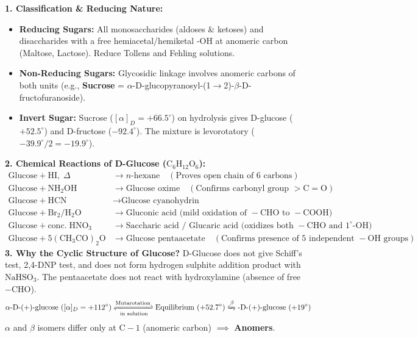 \documentclass[10pt,a4paper]{article}
\begin{document}
\begin{formulabox}
\textbf{1. Classification \& Reducing Nature:}
\begin{itemize}
  \item \textbf{Reducing Sugars:} All monosaccharides (aldoses \& ketoses) and disaccharides with a free hemiacetal/hemiketal -OH at anomeric carbon (Maltose, Lactose). Reduce Tollens and Fehling solutions.
  \item \textbf{Non-Reducing Sugars:} Glycosidic linkage involves anomeric carbons of both units (e.g., \textbf{Sucrose} = $\alpha$-D-glucopyranosyl-(1$\to$2)-$\beta$-D-fructofuranoside).
  \item \textbf{Invert Sugar:} Sucrose ($[\alpha]_D = +66.5^\circ$) on hydrolysis gives D-glucose ($+52.5^\circ$) and D-fructose ($-92.4^\circ$). The mixture is levorotatory ($-39.9^\circ / 2 = -19.9^\circ$).
\end{itemize}
\textbf{2. Chemical Reactions of D-Glucose ($\mathrm{C_6H_{12}O_6}$):}
\begin{align*}
  \mathrm{Glucose} + \mathrm{HI},\; \Delta & \longrightarrow n\text{-hexane} \quad (\text{Proves open chain of 6 carbons})\\
  \mathrm{Glucose} + \mathrm{NH_2OH} & \longrightarrow \text{Glucose oxime} \quad (\text{Confirms carbonyl group } >\mathrm{C=O})\\
  \mathrm{Glucose} + \mathrm{HCN} & \longrightarrow \text{Glucose cyanohydrin}\\
  \mathrm{Glucose} + \mathrm{Br_2 / H_2O} & \longrightarrow \text{Gluconic acid (mild oxidation of }-\mathrm{CHO} \text{ to }-\mathrm{COOH})\\
  \mathrm{Glucose} + \mathrm{conc.\; HNO_3} & \longrightarrow \text{Saccharic acid / Glucaric acid (oxidizes both }-\mathrm{CHO} \text{ and } 1^\circ\text{-OH})\\
  \mathrm{Glucose} + 5(\mathrm{CH_3CO})_2\mathrm{O} & \longrightarrow \text{Glucose pentaacetate} \quad (\text{Confirms presence of 5 independent }-\mathrm{OH} \text{ groups})
\end{align*}
\textbf{3. Why the Cyclic Structure of Glucose?}
D-Glucose does not give Schiff's test, 2,4-DNP test, and does not form hydrogen sulphite addition product with $\mathrm{NaHSO}_3$. The pentaacetate does not react with hydroxylamine (absence of free $-\mathrm{CHO}$).
\begin{equation}
  \alpha\text{-D-(+)-glucose } ([\alpha]_D = +112^\circ) \xrightleftharpoons[\text{in solution}]{\text{Mutarotation}} \text{Equilibrium } (+52.7^\circ) \xleftrightharpoons \beta\text{-D-(+)-glucose } (+19^\circ)
\end{equation}
$\alpha$ and $\beta$ isomers differ only at $\mathrm{C-1}$ (anomeric carbon) $\implies$ \textbf{Anomers}.
\end{formulabox}
\end{document}
